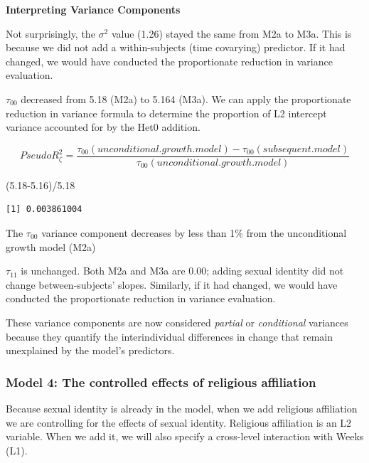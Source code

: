 \documentclass[
  11pt,
]{book}
\newenvironment{Shaded}{\begin{snugshade}}{\end{snugshade}}
\newcommand{\FloatTok}[1]{\textcolor[rgb]{0.00,0.00,0.81}{#1}}
\newcommand{\NormalTok}[1]{#1}
\newcommand{\SpecialCharTok}[1]{\textcolor[rgb]{0.00,0.00,0.00}{#1}}
\begin{document}
\textbf{Interpreting Variance Components}

Not surprisingly, the \(\sigma ^{2}\) value (1.26) stayed the same from M2a to M3a. This is because we did not add a within-subjects (time covarying) predictor. If it had changed, we would have conducted the proportionate reduction in variance evaluation.

\(\tau _{00}\) decreased from 5.18 (M2a) to 5.164 (M3a). We can apply the proportionate reduction in variance formula to determine the proportion of L2 intercept variance accounted for by the Het0 addition.

\[Pseudo R_{\zeta }^{2} = \frac{\tau _{00} (unconditional. growth. model) - \tau _{00}(subsequent. model)}{\tau _{00}(unconditional. growth. model)}\]

\begin{Shaded}
\begin{Highlighting}[]
\NormalTok{(}\FloatTok{5.18{-}5.16}\NormalTok{)}\SpecialCharTok{/}\FloatTok{5.18}
\end{Highlighting}
\end{Shaded}

\begin{verbatim}
[1] 0.003861004
\end{verbatim}

The \(\tau _{00}\) variance component decreases by less than 1\% from the unconditional growth model (M2a)

\(\tau _{11}\) is unchanged. Both M2a and M3a are 0.00; adding sexual identity did not change between-subjects' slopes. Similarly, if it had changed, we would have conducted the proportionate reduction in variance evaluation.

These variance components are now considered \emph{partial} or \emph{conditional} variances because they quantify the interindividual differences in change that remain unexplained by the model's predictors.

\hypertarget{model-4-the-controlled-effects-of-religious-affiliation}{%
\subsubsection{Model 4: The controlled effects of religious affiliation}\label{model-4-the-controlled-effects-of-religious-affiliation}}

Because sexual identity is already in the model, when we add religious affiliation we are controlling for the effects of sexual identity. Religious affiliation is an L2 variable. When we add it, we will also specify a cross-level interaction with Weeks (L1).
\end{document}
